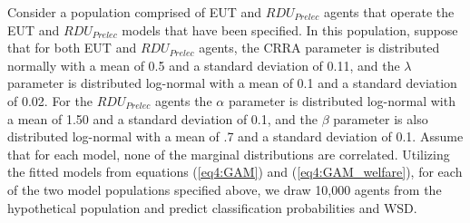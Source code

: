 \documentclass[../main.tex]{subfiles}
\begin{document}
Consider a population comprised of EUT and $\mathit{RDU_{Prelec}}$ agents that operate the EUT and $\mathit{RDU_{Prelec}}$ models that have been specified.
In this population, suppose that for both EUT and $\mathit{RDU_{Prelec}}$ agents, the CRRA parameter is distributed normally with a mean of 0.5 and a standard deviation of 0.11, and the $\lambda$ parameter is distributed log-normal with a mean of 0.1 and a standard deviation of 0.02.
For the $\mathit{RDU_{Prelec}}$ agents the $\alpha$ parameter is distributed log-normal with a mean of 1.50 and a standard deviation of 0.1, and the $\beta$ parameter is also distributed log-normal with a mean of .7 and a standard deviation of 0.1.
Assume that for each model, none of the marginal distributions are correlated.
Utilizing the fitted models from equations (\ref{eq4:GAM}) and (\ref{eq4:GAM_welfare}), for each of the two model populations specified above, we draw 10,000 agents from the hypothetical population and predict classification probabilities and WSD.

\break
\end{document}
